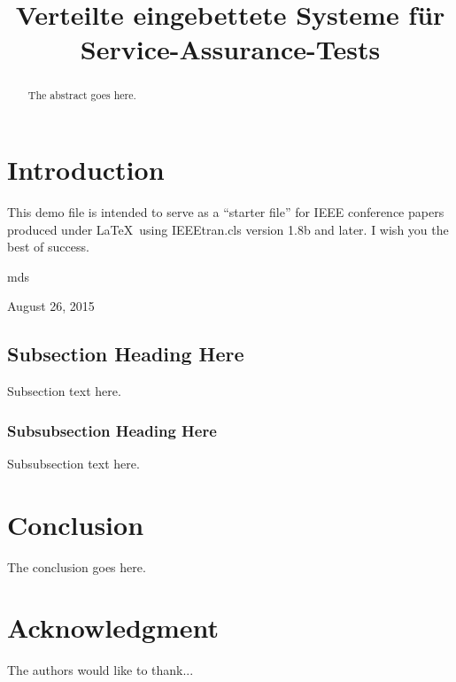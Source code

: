 \documentclass[conference]{IEEEtran}
\begin{document}
\title{Verteilte eingebettete Systeme für Service-Assurance-Tests}
\author{
}

\maketitle

\begin{abstract}
The abstract goes here.
\end{abstract}

\IEEEpeerreviewmaketitle



\section{Introduction}
This demo file is intended to serve as a ``starter file''
for IEEE conference papers produced under \LaTeX\ using
IEEEtran.cls version 1.8b and later.
I wish you the best of success.

\hfill mds

\hfill August 26, 2015

\subsection{Subsection Heading Here}
Subsection text here.


\subsubsection{Subsubsection Heading Here}
Subsubsection text here.


\section{Conclusion}
The conclusion goes here.

\section*{Acknowledgment}


The authors would like to thank...
\end{document}
